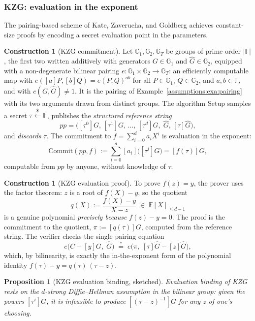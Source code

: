 \documentclass[11pt,a4paper]{article}
\newtheorem{proposition}[theorem]{Proposition}
\theoremstyle{definition}
\newtheorem{construction}[theorem]{Construction}
\theoremstyle{remark}
\newcommand{\F}{\ensuremath{\mathbb{F}}}
\newcommand{\G}{\ensuremath{\mathbb{G}}}
\providecommand{\abs}[1]{\lvert #1 \rvert}
\begin{document}
\subsubsection*{KZG: evaluation in the exponent}

The pairing-based scheme of Kate, Zaverucha, and Goldberg achieves
constant-size proofs by encoding a secret evaluation point in the
parameters.

\begin{construction}[KZG commitment]\label{commitments:def:kzg}
Let \(\G_1, \G_2, \G_T\) be groups of prime order \(\abs{\F}\), the
first two written additively with generators \(G \in \G_1\) and
\(\hat G \in \G_2\), equipped with a non-degenerate bilinear pairing
\(e \colon \G_1 \times \G_2 \to \G_T\): an efficiently computable
map with \(e([a]P, [b]Q) = e(P, Q)^{ab}\) for all \(P \in \G_1\),
\(Q \in \G_2\), and \(a, b \in \F\), and with
\(e(G, \hat G) \ne 1\). It is the pairing of
Example~\ref{assumptions:exa:pairing} with its two arguments drawn
from distinct groups. The algorithm
\(\mathrm{Setup}\) samples a secret \(\tau \xleftarrow{\$} \F\),
publishes the \emph{structured reference string}
\[
pp = \bigl( [\tau^0]G,\, [\tau^1]G,\, \dots,\, [\tau^d]G,\;
            \hat G,\, [\tau]\hat G \bigr),
\]
and \emph{discards} \(\tau\). The commitment to
\(f = \sum_{i=0}^{d} a_i X^{i}\) is evaluation in the exponent:
\[
\mathrm{Commit}(pp, f)
:= \sum_{i=0}^{d} [a_i]\bigl([\tau^{i}]G\bigr)
 = [f(\tau)]G,
\]
computable from \(pp\) by anyone, without knowledge of \(\tau\).
\end{construction}

\begin{construction}[KZG evaluation proof]
\label{commitments:def:kzg-eval}
To prove \(f(z) = y\), the prover uses the factor theorem: \(z\) is
a root of \(f(X) - y\), so the quotient
\[
q(X) := \frac{f(X) - y}{X - z} \;\in\; \F[X]_{\le d-1}
\]
is a genuine polynomial \emph{precisely because} \(f(z) - y = 0\).
The proof is the commitment to the quotient,
\(\pi := [q(\tau)]G\), computed from the reference string. The
verifier checks the single pairing equation
\[
e\bigl(C - [y]G,\; \hat G\bigr)
\;\stackrel{?}{=}\;
e\bigl(\pi,\; [\tau]\hat G - [z]\hat G\bigr),
\]
which, by bilinearity, is exactly the in-the-exponent form of the
polynomial identity \(f(\tau) - y = q(\tau)\,(\tau - z)\).
\end{construction}

\begin{proposition}[KZG evaluation binding, sketched]
\label{commitments:prop:kzg-binding}
Evaluation binding of KZG rests on the \(d\)-strong Diffie--Hellman
assumption in the bilinear group: given the powers
\([\tau^{i}]G\), it is infeasible to produce
\([(\tau - z)^{-1}]G\) for any \(z\) of one's choosing.
\end{proposition}
\end{document}
